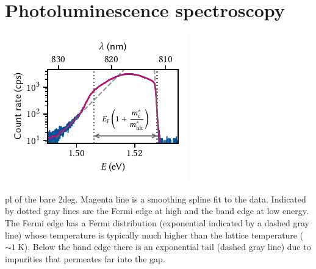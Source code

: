 \section{Photoluminescence spectroscopy}\label{sec:exp:observations:pl}

\begin{marginfigure}
    \centering
    \includegraphics{img/pdf/experiment/2deg_pl}
    \caption[
        \protect\newline
    ]{
        \Gls{pl} of the bare \gls{2deg}.
        Magenta line is a smoothing spline fit to the data.
        Indicated by dotted gray lines are the Fermi edge at high and the band edge at low energy.
        The Fermi edge has a Fermi distribution (exponential indicated by a dashed gray line) whose temperature is typically much higher than the lattice temperature ($\sim\qty{1}{\kelvin}$).
        Below the band edge there is an exponential tail (dashed gray line) due to impurities that permeates far into the gap.
    }
    \label{fig:exp:pl:2deg}
\end{marginfigure}

